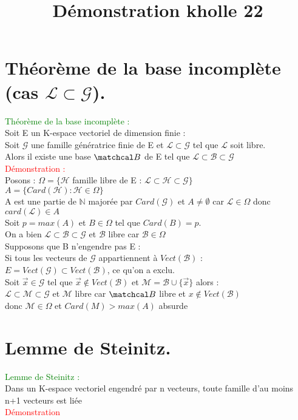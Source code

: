 \documentclass{article}
\begin{document}
\title{Démonstration kholle 22}
\date{}
\maketitle
	\renewcommand{\thesection}{\Roman{section}}
	\setlength{\parindent}{1.5cm}
\section{Théorème de la base incomplète (cas $\mathcal L \subset \mathcal G$).}
\textcolor{green}{Théorème de la base incomplète :} \\
Soit  E un K-espace vectoriel de dimension finie : \\
Soit $ \mathcal G$ une famille génératrice finie de E et $\mathcal L \subset \mathcal G$ tel que $ \mathcal L$ soit libre. \\
Alors il existe une base $\matchcal B$ de E tel que $\mathcal L \subset \mathcal B \subset \mathcal G$ \\
\textcolor{red}{Démonstration :} \\
Posons : $\Omega= \lbrace \mathcal H$ famille libre de E : $ \mathcal L \subset \mathcal H \subset \mathcal G \rbrace$ \\
$A= \lbrace Card(\mathcal H) : \mathcal H \in \Omega \rbrace$ \\
A est une partie de $\mathbb N$ majorée par $Card(\mathcal G)$ et $A \neq \emptyset$ car $ \mathcal L \in \Omega $ donc $card(\mathcal L) \in A$ \\
Soit $p=max(A)$ et $B \in \Omega$ tel que $Card(B)=p$. \\
On a bien $\mathcal L \subset \mathcal B \subset \mathcal G$ et $\mathcal B$ libre car $\mathcal B \in \Omega$ \\
Supposons que B n'engendre pas E : \\
Si tous les vecteurs de $\mathcal G$ appartiennent à $Vect(\mathcal B)$ : \\
$E=Vect(\mathcal G) \subset Vect(\mathcal B)$, ce qu'on a exclu. \\
Soit $\vec x \in \mathcal G$ tel que $\vec x \notin Vect( \mathcal B )$ et $\mathcal M= \mathcal B \cup \lbrace \vec x \rbrace$ alors : \\
$\mathcal L \subset \mathcal M \subset \mathcal G$ et $ \mathcal M$ libre car $ \matchcal B$ libre et $x \notin Vect(\mathcal B)$ \\
donc $\mathcal M \in \Omega$ et $Card(M)>max(A)$ absurde
\section{Lemme de Steinitz.}
\textcolor{green}{Lemme de Steinitz :} \\
Dans un K-espace vectoriel engendré par n vecteurs, toute famille d'au moins n+1 vecteurs est liée \\
\textcolor{red}{Démonstration}
\end{document}
